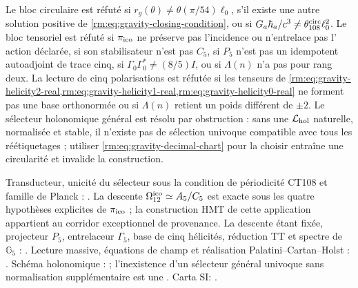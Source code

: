 \begin{falsifier}
Le bloc circulaire est réfuté si
\(r_g(\theta)\neq\theta(\pi/54)\ell_0\), s'il existe une autre solution positive
de \cref{rm:eq:gravity-closing-condition}, ou si
\(G_a\hbar_a/c^3\neq\theta_{108}^{\rm circ}\ell_0^2\). Le bloc tensoriel est
réfuté si \(\pi_{\rm ico}\) ne préserve pas l'incidence ou n'entrelace pas l'
action déclarée, si son stabilisateur n'est pas \(C_5\), si \(P_5\) n'est pas
un idempotent autoadjoint de trace cinq, si
\(\Gamma_0\Gamma_0^*\neq(8/5)I\), ou si \(\Lambda(n)\) n'a pas pour rang deux.
La lecture de cinq polarisations est réfutée si les tenseurs de
\cref{rm:eq:gravity-helicity2-real,rm:eq:gravity-helicity1-real,rm:eq:gravity-helicity0-real}
ne forment pas une base orthonormée ou si \(\Lambda(n)\) retient un poids différent de
\(\pm2\).
Le sélecteur holonomique général est résolu par obstruction : sans une
\(\mathcal L_{\rm hol}\) naturelle, normalisée et stable, il n'existe pas de
sélection univoque compatible avec tous les réétiquetages ; utiliser
\cref{rm:eq:gravity-decimal-chart} pour la choisir entraîne une circularité et
invalide la construction.
\end{falsifier}

\begin{statusbox}
Transducteur, unicité du sélecteur sous la condition de périodicité CT108 et
famille de Planck : .
La descente \(\Omega_{12}^{\rm ico}\simeq A_5/C_5\) est exacte sous les quatre
hypothèses explicites de \(\pi_{\rm ico}\) ; la construction HMT de cette
application appartient au corridor exceptionnel de provenance. La descente étant fixée,
projecteur \(P_5\), entrelaceur \(\Gamma_5\), base de cinq hélicités,
réduction TT et spectre de \(\mathbb G_5\) : .
Lecture massive, équations de champ et réalisation
Palatini--Cartan--Holst : . Schéma
holonomique : ; l'inexistence d'un
sélecteur général univoque sans normalisation supplémentaire est une
. Carta SI:
.
\end{statusbox}
